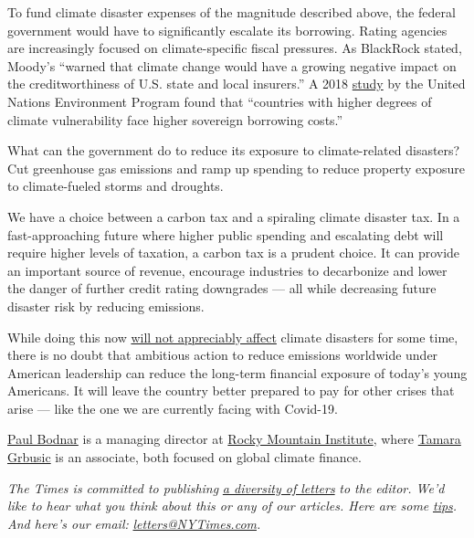 To fund climate disaster expenses of the magnitude described above, the
federal government would have to significantly escalate its borrowing.
Rating agencies are increasingly focused on climate-specific fiscal
pressures. As BlackRock stated, Moody's ``warned that climate change
would have a growing negative impact on the creditworthiness of U.S.
state and local insurers.'' A 2018
\href{http://wedocs.unep.org/bitstream/handle/20.500.11822/26007/Climate_Change_Costs.pdf?sequence=1\&isAllowed=y}{study}
by the United Nations Environment Program found that ``countries with
higher degrees of climate vulnerability face higher sovereign borrowing
costs.''

What can the government do to reduce its exposure to climate-related
disasters? Cut greenhouse gas emissions and ramp up spending to reduce
property exposure to climate-fueled storms and droughts.

We have a choice between a carbon tax and a spiraling climate disaster
tax. In a fast-approaching future where higher public spending and
escalating debt will require higher levels of taxation, a carbon tax is
a prudent choice. It can provide an important source of revenue,
encourage industries to decarbonize and lower the danger of further
credit rating downgrades --- all while decreasing future disaster risk
by reducing emissions.

While doing this now
\href{https://earthobservatory.nasa.gov/features/HeatBucket/heatbucket4.php}{will
not appreciably affect} climate disasters for some time, there is no
doubt that ambitious action to reduce emissions worldwide under American
leadership can reduce the long-term financial exposure of today's young
Americans. It will leave the country better prepared to pay for other
crises that arise --- like the one we are currently facing with
Covid-19.

\href{https://rmi.org/people/paul-bodnar/}{Paul Bodnar} is a managing
director at \href{https://rmi.org/}{Rocky Mountain Institute}, where
\href{https://rmi.org/people/tamara-grbusic/}{Tamara Grbusic} is an
associate, both focused on global climate finance.

\emph{The Times is committed to publishing}
\href{https://www.nytimes3xbfgragh.onion/2019/01/31/opinion/letters/letters-to-editor-new-york-times-women.html}{\emph{a
diversity of letters}} \emph{to the editor. We'd like to hear what you
think about this or any of our articles. Here are some}
\href{https://help.nytimes3xbfgragh.onion/hc/en-us/articles/115014925288-How-to-submit-a-letter-to-the-editor}{\emph{tips}}\emph{.
And here's our email:}
\href{mailto:letters@NYTimes.com}{\emph{letters@NYTimes.com}}\emph{.}

